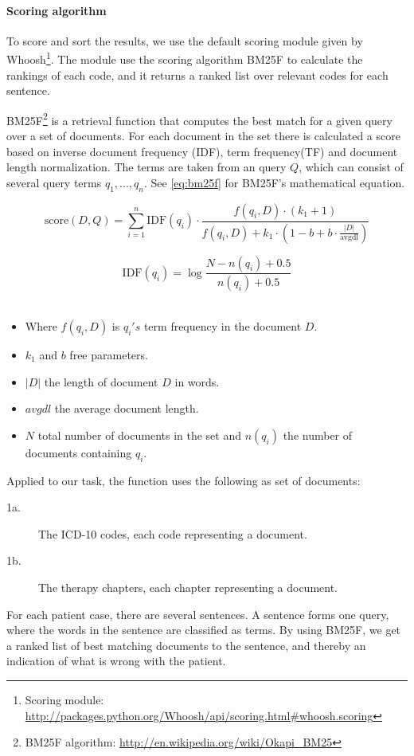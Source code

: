 \paragraph{Scoring algorithm}
To score and sort the results, we use the default scoring module given by Whoosh\footnote{Scoring module: \url{http://packages.python.org/Whoosh/api/scoring.html\#whoosh.scoring}}. The module use the scoring algorithm BM25F to calculate the rankings of each code, and it returns a ranked list over relevant codes for each sentence.

BM25F\footnote{BM25F algorithm: \url{http://en.wikipedia.org/wiki/Okapi_BM25}} is a retrieval function that computes the best match for a given query over a set of documents.  For each document in the set there is calculated a score based on inverse document frequency (IDF), term frequency(TF) and document length normalization. The terms are taken from an query \(Q\), which can consist of several query terms \(q_{1}, ... , q_{n}\). See \autoref{eq:bm25f} for BM25F's mathematical equation.

\begin{equation} \label{eq:bm25f}
	\text{score}(D,Q) = \sum_{i=1}^{n} \text{IDF}(q_i) \cdot \frac{f(q_i, D) \cdot (k_1 + 1)}{f(q_i, D) + k_1 \cdot (1 - b + b \cdot \frac{|D|}{\text{avgdl}})}
\end{equation}

\begin{equation} \label{eq:idf}
	\text{IDF}(q_i) = \log \frac{N - n(q_i) + 0.5}{n(q_i) + 0.5}
\end{equation}\\
\begin{itemize}
\item Where \( f(q_i, D) \)  is \(q_{i}'s\) term frequency in the document \(D\).
\item \(k_{1}\) and \(b\) free parameters.
\item \(|D|\) the length of document \(D\) in words.
\item \(avgdl\) the average document length.
\item \(N\) total number of documents in the set and \(n(q_{i})\) the number of documents containing \(q_{i}\).
\end{itemize}
Applied to our task, the function uses the following as set of documents:
\begin{description}
\item[1a.] The ICD-10 codes, each code representing a document.
\item[1b.] The therapy chapters, each chapter representing a document. 
\end{description}
For each patient case, there are several sentences. A sentence forms one query, where the words in the sentence are classified as terms. By using BM25F, we get a ranked list of best matching documents to the sentence, and thereby an indication of what is wrong with the patient. 


